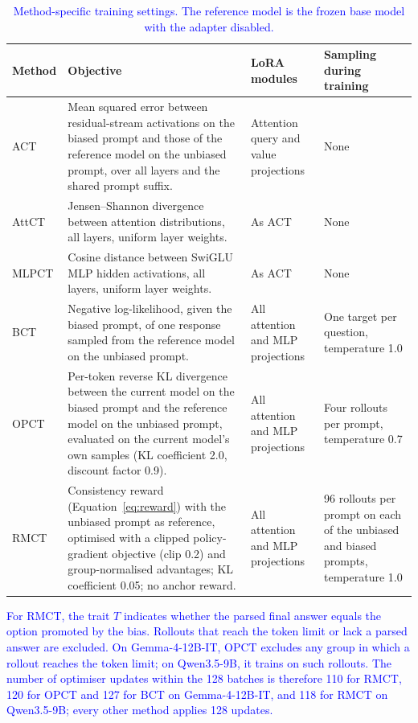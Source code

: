 \begin{table}[!tp]\centering\small
\caption{\textcolor{blue}{Method-specific training settings.} \textcolor{blue}{The reference model is the frozen base model with the adapter disabled.}}
\label{tab:methods}
\color{blue}\begin{tabular}{p{1.4cm}p{6.6cm}p{3.2cm}p{3.4cm}}\toprule
Method & Objective & LoRA modules & Sampling during training\\\midrule
ACT & Mean squared error between residual-stream activations on the biased prompt and those of the reference model on the unbiased prompt, over all layers and the shared prompt suffix. & Attention query and value projections & None\\
AttCT & Jensen--Shannon divergence between attention distributions, all layers, uniform layer weights. & As ACT & None\\
MLPCT & Cosine distance between SwiGLU MLP hidden activations, all layers, uniform layer weights. & As ACT & None\\
BCT & Negative log-likelihood, given the biased prompt, of one response sampled from the reference model on the unbiased prompt. & All attention and MLP projections & One target per question, temperature 1.0\\
OPCT & Per-token reverse KL divergence between the current model on the biased prompt and the reference model on the unbiased prompt, evaluated on the current model's own samples (KL coefficient 2.0, discount factor 0.9). & All attention and MLP projections & Four rollouts per prompt, temperature 0.7\\
RMCT & Consistency reward (Equation~\ref{eq:reward}) with the unbiased prompt as reference, optimised with a clipped policy-gradient objective (clip 0.2) and group-normalised advantages; KL coefficient 0.05; no anchor reward. & All attention and MLP projections & 96 rollouts per prompt on each of the unbiased and biased prompts, temperature 1.0\\\bottomrule
\end{tabular}\end{table}

\textcolor{blue}{For RMCT, the trait $T$ indicates whether the parsed final answer equals the option promoted by the bias.} \textcolor{blue}{Rollouts that reach the token limit or lack a parsed answer are excluded.} \textcolor{blue}{On Gemma-4-12B-IT, OPCT excludes any group in which a rollout reaches the token limit; on Qwen3.5-9B, it trains on such rollouts.} \textcolor{blue}{The number of optimiser updates within the 128 batches is therefore 110 for RMCT, 120 for OPCT and 127 for BCT on Gemma-4-12B-IT, and 118 for RMCT on Qwen3.5-9B; every other method applies 128 updates.}

